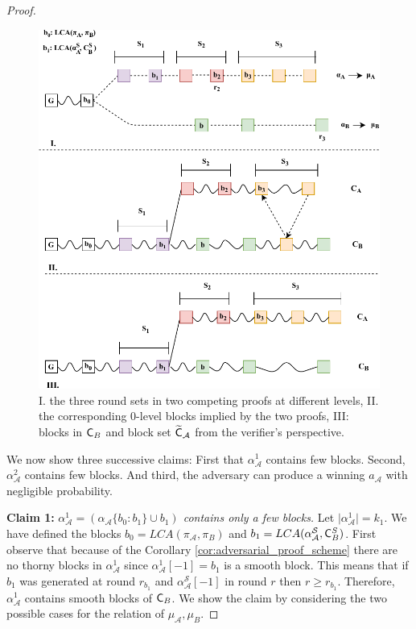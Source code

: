 \begin{proof}
\begin{figure}[h!]
    \begin{center}
        \includegraphics[width=\columnwidth]{figures/proof_velvet-crop.pdf}
    \end{center}
    \caption{I. the three round sets in two competing proofs at different levels, II. the corresponding 0-level blocks implied by the two proofs, III: blocks in $\mathsf{C}_B$ and block set $\widetilde{\mathsf{C}}_\mathcal{A}$ from the verifier's perspective.}
    \label{fig:proof_velvet}
\end{figure}

We now show three successive claims: First that $\alpha_\mathcal{A}^1$ contains few blocks. Second, $\alpha_\mathcal{A}^2$ contains few blocks. And third, the adversary can produce a winning $a_\mathcal{A}$ with negligible probability.

\textbf{Claim 1:} \textit{$\alpha_\mathcal{A}^1 = (\alpha_\mathcal{A}\{b_0 : b_1\} \cup b_1)$ contains only a few blocks.} Let $\lvert \alpha^1_\mathcal{A} \rvert = k_1$. We have defined the blocks $b_0 = LCA(\pi_\mathcal{A}, \pi_B)$ and $b_1 = LCA(\alpha^{\mathcal{S}}_\mathcal{A}, \mathsf{C}^S_B)$. First observe that because of the Corollary \ref{cor:adversarial_proof_scheme} there are no thorny blocks in $\alpha_\mathcal{A}^1$ since $\alpha_\mathcal{A}^1[-1] = b_1$ is a smooth block. This means that if $b_1$ was generated at round $r_{b_1}$ and $\alpha^{\mathcal{S}}_\mathcal{A}[-1]$ in round $r$ then $r \geq r_{b_1}$. Therefore, $\alpha_\mathcal{A}^1$ contains smooth blocks of $\mathsf{C}_B$. We show the claim by considering the two possible cases for the relation of $\mu_\mathcal{A}, \mu_B$.


\end{proof}
